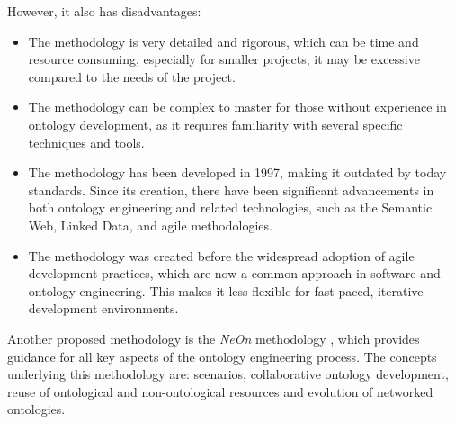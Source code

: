 However, it also has disadvantages:
\begin{itemize}
    \item The methodology is very detailed and rigorous, which can be time and resource consuming, especially for smaller projects, it may be excessive compared to the needs of the project.

    \item The methodology can be complex to master for those without experience in ontology development, as it requires familiarity with several specific techniques and tools.

    \item The methodology has been developed in 1997, making it outdated by today standards. Since its creation, there have been significant advancements in both ontology engineering and related technologies, such as the Semantic Web, Linked Data, and agile methodologies.

    \item The methodology was created before the widespread adoption of agile development practices, which are now a common approach in software and ontology engineering. This makes it less flexible for fast-paced, iterative development environments.
\end{itemize}

Another proposed methodology is the \textit{NeOn} methodology \cite{neon1,neon2}, which provides guidance for all key aspects of the ontology engineering process.
The concepts underlying this methodology are: scenarios, collaborative ontology development, reuse of ontological and non-ontological resources and evolution of networked ontologies. 

